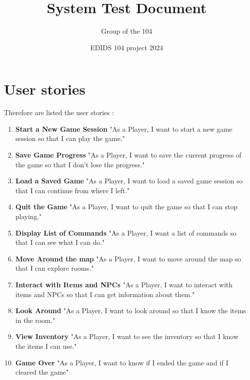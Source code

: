 \documentclass{article}
\title{\textbf{System Test Document}}
\author{Group of the 104}
\date{EDIDS 104 project 2024}
\begin{document}
\maketitle

\section{User stories}

Therefore are listed the user stories :

\begin{enumerate}
    \item \textbf{Start a New Game Session}
"As a Player, I want to start a new game session so that I can play the game."

    \item \textbf{Save Game Progress}
"As a Player, I want to save the current progress of the game so that I don’t lose the progress."

    \item \textbf{Load a Saved Game}
"As a Player, I want to load a saved game session so that I can continue from where I left."

    \item \textbf{Quit the Game}
"As a Player, I want to quit the game so that I can stop playing."

    \item \textbf{Display List of Commands}
"As a Player, I want a list of commands so that I can see what I can do."

    \item \textbf{Move Around the map}
"As a Player, I want to move around the map so that I can explore rooms."

    \item \textbf{Interact with Items and NPCs}
"As a Player, I want to interact with items and NPCs so that I can get information about them."

    \item \textbf{Look Around}
"As a Player, I want to look around so that I know the items in the room."

    \item \textbf{View Inventory}
"As a Player, I want to see the inventory so that I know the items I can use."

\item \textbf{Game Over}
"As a Player, I want to know if I ended the game and if I cleared the game"

\end{enumerate}
\end{document}
